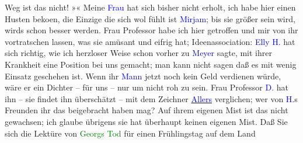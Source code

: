                Weg ist das nicht! »\label{K_L01016_1v}\label{K_L01016_1h}«\pend
           \pstart
           Meine \textcolor{blue}{Frau}{} hat sich bisher
               nicht erholt, ich habe hier einen Husten beko{\geminationm}en, die
               Einzige die sich wol fühlt ist \textcolor{blue}{Mirjam}{}\ledrightnote{\textcolor{blue}{Mirjam Beer-Hofmann}}; bis sie
               größer sein wird, wirds schon besser werden. Frau Professor \label{K_L01016_2v}\label{K_L01016_2h} habe ich hier getroffen
               und mir von ihr vortratschen lassen, was sie amüsant und eifrig hat;
               Ideenassociation: \textcolor{blue}{Elly H.}{}\ledrightnote{\textcolor{blue}{Elly Petersen}} hat sich richtig, wie
               ich herzloser Weise schon vorher zu \textcolor{blue}{Meyer}{}\ledrightnote{\textcolor{blue}{Oskar Mayer}} sagte, mit ihrer Krankheit eine {\pb}Position bei uns gemacht; man kann
               nicht sagen daß es mit wenig Einsatz geschehen ist. Wenn ihr \textcolor{blue}{Mann}{} jetzt noch kein Geld verdienen würde,
               wäre er ein Dichter – für uns – nur um nicht roh zu sein. Frau Professor \textcolor{blue}{D.}{}\ledrightnote{\textcolor{blue}{Berta Doepler}} hat ihn – sie findet ihn überschätzt – mit dem
               Zeichner \uline{\textcolor{blue}{Allers}{}\ledrightnote{\textcolor{blue}{Christian Wilhelm Allers}}} verglichen; wer von \textcolor{blue}{H.}{}\ledrightnote{\textcolor{blue}{Georg Hirschfeld}}s Freunden ihr das
               beigebracht haben mag? Auf ihrem eigenen Mist ist das nicht gewachsen; ich glaube
               übrigens sie hat überhaupt keinen eigenen Mist. Daß Sie sich die Lektüre von \textcolor{green}{Georgs Tod}{}\ledrightnote{\textcolor{green}{Der Tod Georgs}} für einen Frühlingstag auf dem Land
